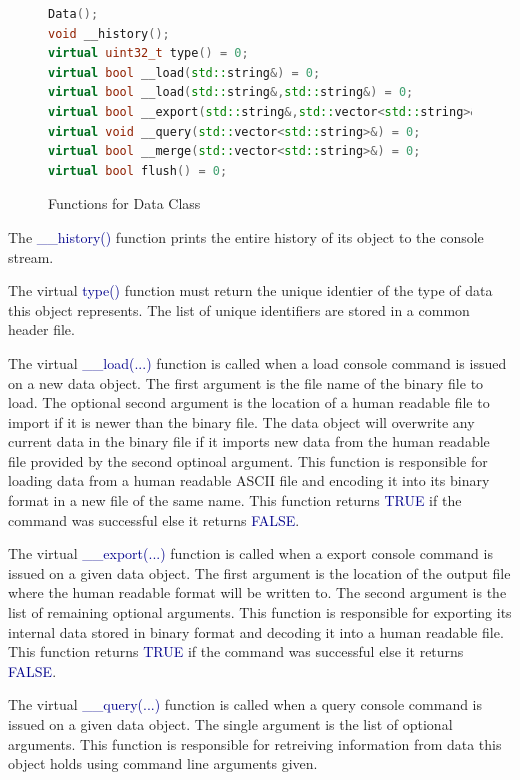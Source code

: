 \documentclass[10pt]{article}
\providecommand{\h}[1]{\textcolor{darkblue}{#1}}
\begin{document}
\begin{figure}[H]
\begin{mdframed}[style=functions]
\begin{lstlisting}[language=C++]
Data();
void __history();
virtual uint32_t type() = 0;
virtual bool __load(std::string&) = 0;
virtual bool __load(std::string&,std::string&) = 0;
virtual bool __export(std::string&,std::vector<std::string>&) = 0;
virtual void __query(std::vector<std::string>&) = 0;
virtual bool __merge(std::vector<std::string>&) = 0;
virtual bool flush() = 0;
\end{lstlisting}
\end{mdframed}
\caption{Functions for Data Class}
\label{fig:data:func}
\end{figure}

The \h{\_\_history()} function prints the entire history of its object to 
the console stream.

The virtual \h{type()} function must return the unique identier of the type of 
data this object represents. The list of unique identifiers are stored in a 
common header file.

The virtual \h{\_\_load(...)} function is called when a load console command 
is issued on a new data object. The first argument is the file name of the 
binary file to load. The optional second argument is the location of a human 
readable file to import if it is newer than the binary file. The data object 
will overwrite any current data in the binary file if it imports new data from 
the human readable file provided by the second optinoal argument. This 
function is responsible for loading data from a human readable ASCII file and 
encoding it into its binary format in a new file of the same name. This 
function returns \h{TRUE} if the command was successful else it returns 
\h{FALSE}.

The virtual \h{\_\_export(...)} function is called when a export console command 
is issued on a given data object. The first argument is the location of the 
output file where the human readable format will be written to. The second 
argument is the list of remaining optional arguments. This function is 
responsible for exporting its internal data stored in binary format and decoding 
it into a human readable file. This function returns \h{TRUE} if the command was 
successful else it returns \h{FALSE}.

The virtual \h{\_\_query(...)} function is called when a query console command 
is issued on a given data object. The single argument is the list of optional 
arguments. This function is responsible for retreiving information from 
data this object holds using command line arguments given.
\end{document}
